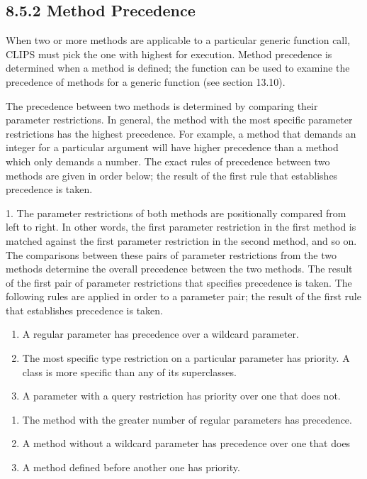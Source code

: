 \documentclass[letterpaper,10pt,english]{sphinxmanual}
\begin{document}
\subsection{8.5.2 Method Precedence}
\label{\detokenize{generic:method-precedence}}
When two or more methods are applicable to a particular generic function
call, CLIPS must pick the one with highest  for execution.
Method precedence is determined when a method is defined; the
 function can be used to examine the precedence of
methods for a generic function (see section 13.10).

The precedence between two methods is determined by comparing their
parameter restrictions. In general, the method with the most specific
parameter restrictions has the highest precedence. For example, a method
that demands an integer for a particular argument will have higher
precedence than a method which only demands a number. The exact rules of
precedence between two methods are given in order below; the result of
the first rule that establishes precedence is taken.

1. The parameter restrictions of both methods are positionally compared
from left to right. In other words, the first parameter restriction in
the first method is matched against the first parameter restriction in
the second method, and so on. The comparisons between these pairs of
parameter restrictions from the two methods determine the overall
precedence between the two methods. The result of the first pair of
parameter restrictions that specifies precedence is taken. The following
rules are applied in order to a parameter pair; the result of the first
rule that establishes precedence is taken.
\begin{enumerate}
\def\theenumi{\alph{enumi}}
\def\labelenumi{\theenumi .}
\makeatletter\def\p@enumii{\p@enumi \theenumi .}\makeatother
\item {} 
A regular parameter has precedence over a wildcard parameter.

\item {} 
The most specific type restriction on a particular parameter has priority.
A class is more specific than any of its superclasses.

\item {} 
A parameter with a query restriction has priority over one that does not.

\end{enumerate}
\begin{enumerate}
\def\theenumi{\arabic{enumi}}
\def\labelenumi{\theenumi .}
\makeatletter\def\p@enumii{\p@enumi \theenumi .}\makeatother
\setcounter{enumi}{1}
\item {} 
The method with the greater number of regular parameters has precedence.

\item {} 
A method without a wildcard parameter has precedence over one that does

\item {} 
A method defined before another one has priority.

\end{enumerate}
\end{document}
